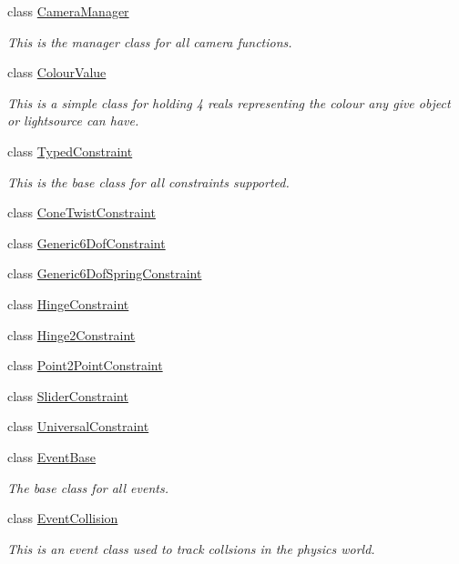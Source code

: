 \begin{DoxyCompactItemize}
class \hyperlink{classphys_1_1CameraManager}{CameraManager}
\begin{DoxyCompactList}\small\item\em This is the manager class for all camera functions. \item\end{DoxyCompactList}\item 
class \hyperlink{classphys_1_1ColourValue}{ColourValue}
\begin{DoxyCompactList}\small\item\em This is a simple class for holding 4 reals representing the colour any give object or lightsource can have. \item\end{DoxyCompactList}\item 
class \hyperlink{classphys_1_1TypedConstraint}{TypedConstraint}
\begin{DoxyCompactList}\small\item\em This is the base class for all constraints supported. \item\end{DoxyCompactList}\item 
class \hyperlink{classphys_1_1ConeTwistConstraint}{ConeTwistConstraint}
\item 
class \hyperlink{classphys_1_1Generic6DofConstraint}{Generic6DofConstraint}
\item 
class \hyperlink{classphys_1_1Generic6DofSpringConstraint}{Generic6DofSpringConstraint}
\item 
class \hyperlink{classphys_1_1HingeConstraint}{HingeConstraint}
\item 
class \hyperlink{classphys_1_1Hinge2Constraint}{Hinge2Constraint}
\item 
class \hyperlink{classphys_1_1Point2PointConstraint}{Point2PointConstraint}
\item 
class \hyperlink{classphys_1_1SliderConstraint}{SliderConstraint}
\item 
class \hyperlink{classphys_1_1UniversalConstraint}{UniversalConstraint}
\item 
class \hyperlink{classphys_1_1EventBase}{EventBase}
\begin{DoxyCompactList}\small\item\em The base class for all events. \item\end{DoxyCompactList}\item 
class \hyperlink{classphys_1_1EventCollision}{EventCollision}
\begin{DoxyCompactList}\small\item\em This is an event class used to track collsions in the physics world. \item\end{DoxyCompactList}\item 

\end{DoxyCompactItemize}
